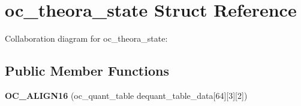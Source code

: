 \hypertarget{structoc__theora__state}{\section{oc\+\_\+theora\+\_\+state Struct Reference}
\label{structoc__theora__state}
}


Collaboration diagram for oc\+\_\+theora\+\_\+state\+:
\subsection*{Public Member Functions}
\begin{DoxyCompactItemize}
\item 
\hypertarget{structoc__theora__state_a34d4f10b8e3ac77b884928f1d715803d}{{\bfseries O\+C\+\_\+\+A\+L\+I\+G\+N16} (oc\+\_\+quant\+\_\+table dequant\+\_\+table\+\_\+data\mbox{[}64\mbox{]}\mbox{[}3\mbox{]}\mbox{[}2\mbox{]})}\label{structoc__theora__state_a34d4f10b8e3ac77b884928f1d715803d}

\end{DoxyCompactItemize}
